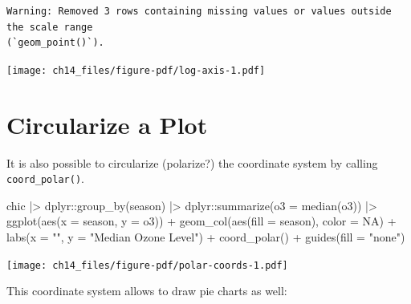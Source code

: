 \documentclass[
  letterpaper,
  DIV=11,
  numbers=noendperiod]{scrreprt}
\newenvironment{Shaded}{\begin{snugshade}}{\end{snugshade}}
\newcommand{\AttributeTok}[1]{\textcolor[rgb]{0.40,0.45,0.13}{#1}}
\newcommand{\ConstantTok}[1]{\textcolor[rgb]{0.56,0.35,0.01}{#1}}
\newcommand{\FunctionTok}[1]{\textcolor[rgb]{0.28,0.35,0.67}{#1}}
\newcommand{\NormalTok}[1]{\textcolor[rgb]{0.00,0.23,0.31}{#1}}
\newcommand{\SpecialCharTok}[1]{\textcolor[rgb]{0.37,0.37,0.37}{#1}}
\newcommand{\StringTok}[1]{\textcolor[rgb]{0.13,0.47,0.30}{#1}}
\begin{document}
\begin{verbatim}
Warning: Removed 3 rows containing missing values or values outside the scale range
(`geom_point()`).
\end{verbatim}

\texttt{[image: ch14\_files/figure-pdf/log-axis-1.pdf]}

\section{Circularize a Plot}\label{circularize-a-plot}

It is also possible to circularize (polarize?) the coordinate system by
calling \texttt{coord\_polar()}.

\begin{Shaded}
\begin{Highlighting}[]
\NormalTok{chic }\SpecialCharTok{|\textgreater{}}
\NormalTok{  dplyr}\SpecialCharTok{::}\FunctionTok{group\_by}\NormalTok{(season) }\SpecialCharTok{|\textgreater{}}
\NormalTok{  dplyr}\SpecialCharTok{::}\FunctionTok{summarize}\NormalTok{(}\AttributeTok{o3 =} \FunctionTok{median}\NormalTok{(o3)) }\SpecialCharTok{|\textgreater{}}
  \FunctionTok{ggplot}\NormalTok{(}\FunctionTok{aes}\NormalTok{(}\AttributeTok{x =}\NormalTok{ season, }\AttributeTok{y =}\NormalTok{ o3)) }\SpecialCharTok{+}
    \FunctionTok{geom\_col}\NormalTok{(}\FunctionTok{aes}\NormalTok{(}\AttributeTok{fill =}\NormalTok{ season), }\AttributeTok{color =} \ConstantTok{NA}\NormalTok{) }\SpecialCharTok{+}
    \FunctionTok{labs}\NormalTok{(}\AttributeTok{x =} \StringTok{""}\NormalTok{, }\AttributeTok{y =} \StringTok{"Median Ozone Level"}\NormalTok{) }\SpecialCharTok{+}
    \FunctionTok{coord\_polar}\NormalTok{() }\SpecialCharTok{+}
    \FunctionTok{guides}\NormalTok{(}\AttributeTok{fill =} \StringTok{"none"}\NormalTok{)}
\end{Highlighting}
\end{Shaded}

\texttt{[image: ch14\_files/figure-pdf/polar-coords-1.pdf]}

This coordinate system allows to draw pie charts as well:
\end{document}
